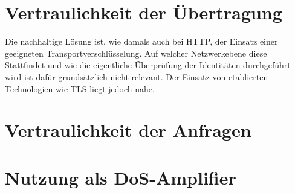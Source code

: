 
\section{ Vertraulichkeit der Übertragung}

Die nachhaltige Lösung ist, wie damals auch bei HTTP, der Einsatz einer geeigneten Transportverschlüsselung. Auf welcher Netzwerkebene diese Stattfindet und wie die eigentliche Überprüfung der Identitäten durchgeführt wird ist dafür grundsätzlich nicht relevant. Der Einsatz von etablierten Technologien wie TLS liegt jedoch nahe.

\section{Vertraulichkeit der Anfragen}

\section{Nutzung als DoS-Amplifier}



